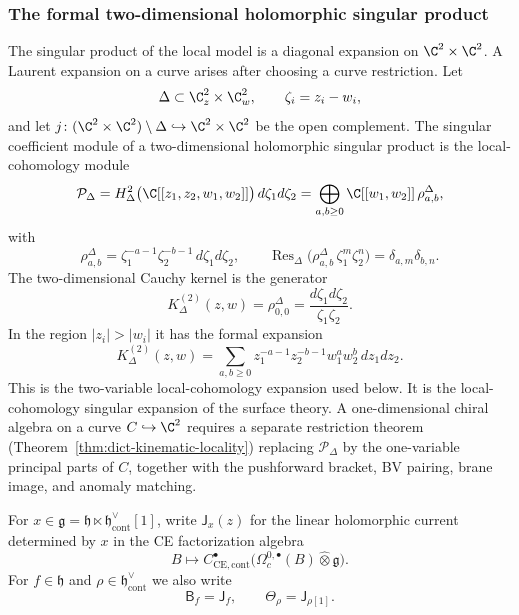 \subsubsection{The formal two-dimensional holomorphic singular product}
\label{sssec:formal-two-dimensional-holomorphic-ope}

The singular product of the local model is a diagonal expansion on
\(\C^2\times\C^2\).  A Laurent expansion on a curve arises after
choosing a curve restriction.  Let
\[
  \Delta\subset \C^2_z\times\C^2_w,\qquad
  \zeta_i=z_i-w_i ,
\]
and let \(j\colon(\C^2\times\C^2)\setminus\Delta\hookrightarrow
\C^2\times\C^2\) be the open complement.  The singular coefficient
module of a two-dimensional holomorphic singular product is the local-cohomology
module
\[
  \mathcal P_\Delta
  =
  H^2_\Delta\bigl(\C[[z_1,z_2,w_1,w_2]]\bigr)\,d\zeta_1d\zeta_2
  =
  \bigoplus_{a,b\ge0}
  \C[[w_1,w_2]]\,\rho^\Delta_{a,b},
\]
with
\[
  \rho^\Delta_{a,b}
  =
  \zeta_1^{-a-1}\zeta_2^{-b-1}\,d\zeta_1d\zeta_2,\qquad
  \operatorname{Res}_\Delta\bigl(\rho^\Delta_{a,b}\,
  \zeta_1^m\zeta_2^n\bigr)=\delta_{a,m}\delta_{b,n}.
\]
The two-dimensional Cauchy kernel is the generator
\[
  K^{(2)}_\Delta(z,w)=\rho^\Delta_{0,0}
  =
  \frac{d\zeta_1d\zeta_2}{\zeta_1\zeta_2}.
\]
In the region \(|z_i|>|w_i|\) it has the formal expansion
\[
  K^{(2)}_\Delta(z,w)
  =
  \sum_{a,b\ge0}
  z_1^{-a-1}z_2^{-b-1}w_1^aw_2^b\,dz_1dz_2 .
\]
This is the two-variable local-cohomology expansion used below.  It
is the local-cohomology singular expansion of the surface theory.  A
one-dimensional chiral algebra on a curve \(C\hookrightarrow\C^2\)
requires a separate restriction theorem
(Theorem~\ref{thm:dict-kinematic-locality}) replacing
\(\mathcal P_\Delta\) by the one-variable principal parts of \(C\),
together with the pushforward bracket, BV pairing, brane image, and
anomaly matching.

For \(x\in\mathfrak g=\mathfrak h\ltimes
 \mathfrak h^\vee_{\mathrm{cont}}[1]\), write \(\mathsf{J}_x(z)\) for
the linear holomorphic current determined by \(x\) in the CE
factorization algebra
\[
  B\longmapsto
  C^\bullet_{\mathrm{CE},\mathrm{cont}}
  \bigl(\Omega_c^{0,\bullet}(B)\widehat\otimes\mathfrak g\bigr).
\]
For \(f\in\mathfrak h\) and
\(\rho\in\mathfrak h^\vee_{\mathrm{cont}}\) we also write
\[
  \mathsf{B}_f=\mathsf{J}_f,\qquad
  \mathsf{\Theta}_\rho=\mathsf{J}_{\rho[1]} .
\]


